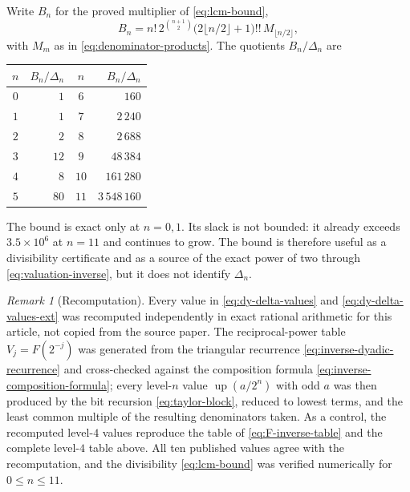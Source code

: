 \documentclass[11pt,oneside]{article}
\theoremstyle{definition}
\theoremstyle{remark}
\newtheorem{remark}[theorem]{Remark}
\newcommand{\Up}{\operatorname{up}}
\begin{document}
Write $B_n$ for the proved multiplier of \eqref{eq:lcm-bound},
\begin{equation}
 B_n=n!\,2^{\binom{n+1}{2}}\bigl(2\lfloor n/2\rfloor+1\bigr)!!\,M_{\lfloor n/2\rfloor},
                                                               \label{eq:dy-bound-multiplier}
\end{equation}
with $M_m$ as in \eqref{eq:denominator-products}.  The quotients $B_n/\Delta_n$ are

\begin{center}
\begin{tabular}{c@{\quad}r@{\qquad\qquad}c@{\quad}r}
\toprule
$n$&$B_n/\Delta_n$&$n$&$B_n/\Delta_n$\\
\midrule
$0$&$1$&$6$&$160$\\
$1$&$1$&$7$&$2\,240$\\
$2$&$2$&$8$&$2\,688$\\
$3$&$12$&$9$&$48\,384$\\
$4$&$8$&$10$&$161\,280$\\
$5$&$80$&$11$&$3\,548\,160$\\
\bottomrule
\end{tabular}
\end{center}

\noindent
The bound is exact only at $n=0,1$.  Its slack is not bounded: it already exceeds
$3.5\times10^6$ at $n=11$ and continues to grow.  The bound is therefore useful as a
divisibility certificate and as a source of the exact power of two through
\eqref{eq:valuation-inverse}, but it does not identify $\Delta_n$.

\begin{remark}[Recomputation]
\label{rem:dy-delta-recomputed}
Every value in \eqref{eq:dy-delta-values} and \eqref{eq:dy-delta-values-ext} was recomputed
independently in exact rational arithmetic for this article, not copied from the source
paper.  The reciprocal-power table $V_j=F(2^{-j})$ was generated from the triangular
recurrence \eqref{eq:inverse-dyadic-recurrence} and cross-checked against the composition
formula \eqref{eq:inverse-composition-formula}; every level-$n$ value $\Up(a/2^n)$ with odd
$a$ was then produced by the bit recursion \eqref{eq:taylor-block}, reduced to lowest terms,
and the least common multiple of the resulting denominators taken.  As a control, the
recomputed level-$4$ values reproduce the table of \eqref{eq:F-inverse-table} and the
complete level-$4$ table above.  All ten published values agree with the recomputation, and
the divisibility \eqref{eq:lcm-bound} was verified numerically for $0\le n\le11$.
\end{remark}
\end{document}
